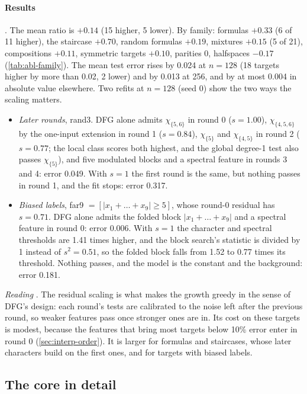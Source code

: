 \paragraph{Results} . The mean ratio is $+0.14$ (15 higher, 5 lower). By family: formulas $+0.33$ (6 of 11 higher), the staircase $+0.70$, random formulas $+0.19$, mixtures $+0.15$ (5 of 21), compositions $+0.11$, symmetric targets $+0.10$, parities 0, halfspaces $-0.17$ (\cref{tab:abl-family}). The mean test error rises by 0.024 at $n=128$ (18 targets higher by more than 0.02, 2 lower) and by 0.013 at 256, and by at most 0.004 in absolute value elsewhere. Two refits at $n=128$ (seed 0) show the two ways the scaling matters.
\begin{itemize}
\item \emph{Later rounds}, rand3. DFG alone admits $\chi_{\{5,6\}}$ in round 0 ($s=1.00$), $\chi_{\{4,5,6\}}$ by the one-input extension in round 1 ($s=0.84$), $\chi_{\{5\}}$ and $\chi_{\{4,5\}}$ in round 2 ($s=0.77$; the local class scores both highest, and the global degree-1 test also passes $\chi_{\{5\}}$), and five modulated blocks and a spectral feature in rounds 3 and 4: error 0.049. With $s=1$ the first round is the same, but nothing passes in round 1, and the fit stops: error 0.317.
\item \emph{Biased labels}, far9 $=[|x_1+\dots+x_9|\ge5]$, whose round-0 residual has $s=0.71$. DFG alone admits the folded block $|x_1+\dots+x_9|$ and a spectral feature in round 0: error 0.006. With $s=1$ the character and spectral thresholds are 1.41 times higher, and the block search's statistic is divided by 1 instead of $s^2=0.51$, so the folded block falls from 1.52 to 0.77 times its threshold. Nothing passes, and the model is the constant and the background: error 0.181.
\end{itemize}

\emph{Reading} . The residual scaling is what makes the growth greedy in the sense of DFG's design: each round's tests are calibrated to the noise left after the previous round, so weaker features pass once stronger ones are in. Its cost on these targets is modest, because the features that bring most targets below 10\% error enter in round 0 (\cref{sec:interp-order}). It is larger for formulas and staircases, whose later characters build on the first ones, and for targets with biased labels.

\subsection{The core in detail}\label{app:core-detail}

